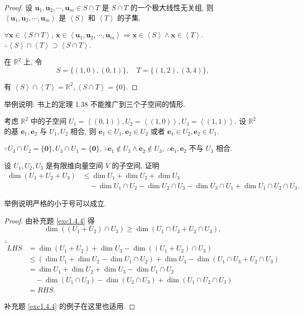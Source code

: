 \documentclass[color=black,device=normal,lang=cn,mode=geye]{elegantnote}
\begin{document}
\begin{proof}
    设 $\boldsymbol{u}_1,\boldsymbol{u}_2,\cdots,\boldsymbol{u}_m\in S\cap T$ 是 $S\cap T$ 的一个极大线性无关组, 则 $\left<\boldsymbol{u}_1,\boldsymbol{u}_2,\cdots,\boldsymbol{u}_m\right>$ 是 $\left<S\right>$ 和 $\left<T\right>$ 的子集.
    
    $\forall\boldsymbol{x}\in\left<S\cap T\right>$, $\boldsymbol{x}\in\left<\boldsymbol{u}_1,\boldsymbol{u}_2,\cdots,\boldsymbol{u}_m\right>\Rightarrow\boldsymbol{x}\in\left<S\right>\wedge\boldsymbol{x}\in\left<T\right>$. $\therefore\left<S\right>\cap\left<T\right>\supset\left<S\cap T\right>$.

    在 $\mathbb{R}^2$ 上, 令
    \[S=\{(1,0),(0,1)\},\quad T=\{(1,2),(3,4)\},\]

    有 $\left<S\right>\cap\left<T\right>=\mathbb{R}^2,\left<S\cap T\right>=\{0\}$.
\end{proof}
\begin{exercisec}[1.40]
    举例说明: 书上的定理 1.38 不能推广到三个子空间的情形.
\end{exercisec}
\begin{solution}
    考虑 $\mathbb{R}^2$ 中的子空间 $U_1=\left<(0,1)\right>,U_2=\left<(1,0)\right>,U_3=\left<(1,1)\right>$. 设 $\mathbb{R}^2$ 的基 $\boldsymbol{e}_1,\boldsymbol{e}_2$ 与 $U_1,U_2$ 相合, 则 $\boldsymbol{e}_1\in U_1,\boldsymbol{e}_2\in U_2$ 或者 $\boldsymbol{e}_1\in U_2,\boldsymbol{e}_2\in U_1$.
    
    $\because U_3\cap U_2=\{\boldsymbol{0}\},U_3\cap U_1=\{\boldsymbol{0}\}$, $\therefore\boldsymbol{e}_1\notin U_3\wedge\boldsymbol{e}_2\notin U_3$, $\therefore\boldsymbol{e}_1,\boldsymbol{e}_2$ 不与 $U_3$ 相合.
\end{solution}
\begin{exercisec}[1.4.1]
    设 $U_1,U_2,U_3$ 是有限维向量空间 $V$ 的子空间, 证明
    \begin{align*}
        \dim(U_1+U_2+U_3) & \leq\dim U_1+\dim U_2+\dim U_3 \\
        & \quad-\dim U_1\cap U_2-\dim U_2\cap U_3-\dim U_3\cap U_1+\dim U_1\cap U_2\cap U_3.
    \end{align*}

    举例说明严格的小于号可以成立.
\end{exercisec}
\begin{proof}
    由补充题 \ref{exc1.4.4} 得
    \[\dim((U_1+U_2)\cap U_3)\geq\dim(U_1\cap U_3+U_2\cap U_3),\]

    $\therefore$
    \begin{align*}
        LHS & =\dim(U_1+U_2)+\dim U_3-\dim((U_1+U_2)\cap U_3) \\
        & \leq(\dim U_1+\dim U_2-\dim U_1\cap U_2)+\dim U_3-\dim(U_1\cap U_3+U_2\cap U_3) \\
        & =\dim U_1+\dim U_2+\dim U_3-\dim U_1\cap U_2 \\
        & \quad-\dim(U_1\cap U_3)-\dim(U_2\cap U_3)+\dim(U_1\cap U_2\cap U_3) \\
        & =RHS.
    \end{align*}

    补充题 \ref{exc1.4.4} 的例子在这里也适用.
\end{proof}
\end{document}

